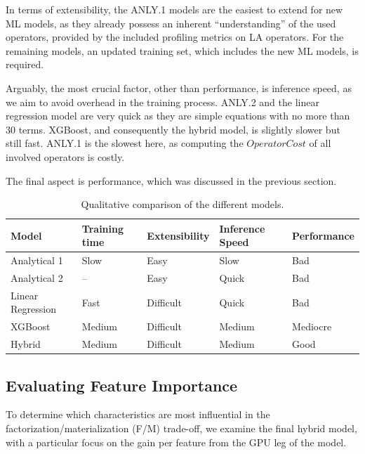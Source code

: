 In terms of extensibility, the ANLY.1 models are the easiest to extend for new ML models, as they already possess an inherent ``understanding'' of the used operators, provided by the included profiling metrics on LA operators. For the remaining models, an updated training set, which includes the new ML models, is required.

Arguably, the most crucial factor, other than performance, is inference speed, as we aim to avoid overhead in the training process. ANLY.2 and the linear regression model are very quick as they are simple equations with no more than $30$ terms. XGBoost, and consequently the hybrid model, is slightly slower but still fast. ANLY.1 is the slowest here, as computing the $OperatorCost$ of all involved operators is costly.

The final aspect is performance, which was discussed in the previous section.

\begin{table}[ht]
    \centering
    \begin{tabular}{lllll}
        \toprule
        Model             & Training time & Extensibility & Inference Speed & Performance \\
        \midrule
        Analytical 1      & Slow          & Easy          & Slow            & Bad         \\
        Analytical 2      & --            & Easy          & Quick           & Bad         \\
        Linear Regression & Fast          & Difficult     & Quick           & Bad         \\
        XGBoost           & Medium        & Difficult     & Medium          & Mediocre    \\
        Hybrid            & Medium        & Difficult     & Medium          & Good        \\
        \bottomrule
    \end{tabular}
    \caption{Qualitative comparison of the different models.}
    \label{tab:5-meta-results}
\end{table}

\subsection{Evaluating Feature Importance}
\label{subsec:6-feature-importance}
To determine which characteristics are most influential in the factorization/materialization (F/M) trade-off, we examine the final hybrid model, with a particular focus on the gain per feature from the GPU leg of the model.

